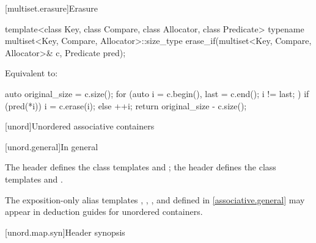 [multiset.erasure]{Erasure}

%
\begin{itemdecl}
template<class Key, class Compare, class Allocator, class Predicate>
  typename multiset<Key, Compare, Allocator>::size_type
    erase_if(multiset<Key, Compare, Allocator>& c, Predicate pred);
\end{itemdecl}

\begin{itemdescr}
\pnum
\effects
Equivalent to:
\begin{codeblock}
auto original_size = c.size();
for (auto i = c.begin(), last = c.end(); i != last; ) {
  if (pred(*i)) {
    i = c.erase(i);
  } else {
    ++i;
  }
}
return original_size - c.size();
\end{codeblock}
\end{itemdescr}

[unord]{Unordered associative containers}

[unord.general]{In general}

\pnum
The header  defines the class templates
 and
; the header  defines the class templates
 and .

\pnum
The exposition-only alias templates
, ,
, and 
defined in \ref{associative.general} may appear in deduction guides for unordered containers.

[unord.map.syn]{Header  synopsis}

